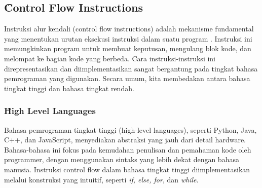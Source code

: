 \subsection{\f{Control Flow Instructions}}
Instruksi alur kendali (control flow instructions) adalah mekanisme fundamental yang menentukan urutan eksekusi instruksi dalam suatu program \cite{cod23}. Instruksi ini memungkinkan program untuk membuat keputusan, mengulang blok kode, dan melompat ke bagian kode yang berbeda. Cara instruksi-instruksi ini direpresentasikan dan diimplementasikan sangat bergantung pada tingkat bahasa pemrograman yang digunakan. Secara umum, kita membedakan antara bahasa tingkat tinggi dan bahasa tingkat rendah.

\subsubsection{\f{High Level Languages}}
Bahasa pemrograman tingkat tinggi (high-level languages), seperti Python, Java, C++, dan JavaScript, menyediakan abstraksi yang jauh dari detail hardware. Bahasa-bahasa ini fokus pada kemudahan penulisan dan pemahaman kode oleh programmer, dengan menggunakan sintaks yang lebih dekat dengan bahasa manusia. Instruksi control flow dalam bahasa tingkat tinggi diimplementasikan melalui konstruksi yang intuitif, seperti \textit{if, else, for}, dan \textit{while}.

